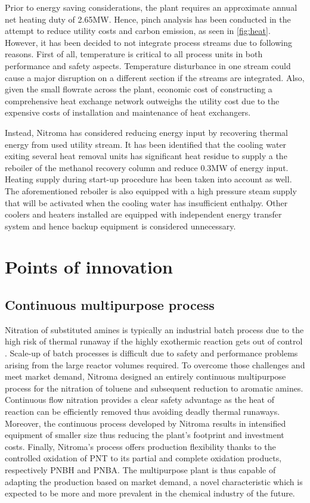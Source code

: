 Prior to energy saving considerations, the plant requires an approximate annual net heating duty of 2.65MW. Hence, pinch analysis has been conducted in the attempt to reduce utility costs and carbon emission, as seen in \cref{fig:heat}. However, it has been decided to not integrate process streams due to following reasons. First of all, temperature is critical to all process units in both performance and safety aspects. Temperature disturbance in one stream could cause a major disruption on a different section if the streams are integrated. Also, given the small flowrate across the plant, economic cost of constructing a comprehensive heat exchange network outweighs the utility cost due to the expensive costs of installation and maintenance of heat exchangers.


 Instead, Nitroma has considered reducing energy input by recovering thermal energy from used utility stream. It has been identified that the cooling water exiting several heat removal units has significant heat residue to supply a the reboiler of the methanol recovery column and reduce 0.3MW of energy input. Heating supply during start-up procedure has been taken into account as well. The aforementioned reboiler is also equipped with a high pressure steam supply that will be activated when the cooling water has insufficient enthalpy. Other coolers and heaters installed are equipped with independent energy transfer system and hence backup equipment is considered unnecessary.

\section{Points of innovation}

\subsection{Continuous multipurpose process}
Nitration of substituted amines is typically an industrial batch process due to the high risk of thermal runaway if the highly exothermic reaction gets out of control \cite{dugal_nitrobenzene_2005}. Scale-up of batch processes is difficult due to safety and performance problems arising from the large reactor volumes required. To overcome those challenges and meet market demand, Nitroma designed an entirely continuous multipurpose process for the nitration of toluene and subsequent reduction to aromatic amines. Continuous flow nitration provides a clear safety advantage as the heat of reaction can be efficiently removed thus avoiding deadly thermal runaways. Moreover, the continuous process developed by Nitroma results in intensified equipment of smaller size thus reducing the plant's footprint and investment costs. Finally, Nitroma's process offers production flexibility thanks to the controlled oxidation of PNT to its partial and complete oxidation products, respectively PNBH and PNBA. The multipurpose plant is thus capable of adapting the production based on market demand, a novel characteristic which is expected to be more and more prevalent in the chemical industry of the future.

